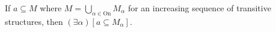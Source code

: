 If $a \subseteq M$ where $M = \bigcup_{\alpha \in \mathrm{On}} M_\alpha$ for an increasing sequence of transitive structures, then $(\exists \alpha)[a \subseteq M_\alpha]$.
